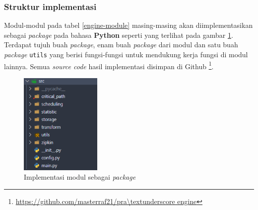 \subsubsection{Struktur implementasi}
Modul-modul pada tabel \ref{engine-module} masing-masing akan diimplementasikan sebagai \textit{package} pada bahasa \textbf{Python} seperti yang terlihat pada gambar \ref{package}. Terdapat tujuh buah \textit{package}, enam buah \textit{package} dari modul dan satu buah \textit{package} \texttt{utils} yang berisi fungsi-fungsi untuk mendukung kerja fungsi di modul lainnya. Semua \textit{source code} hasil implementasi disimpan di Github \footnote{\url{https://github.com/masterraf21/pra\textunderscore engine}}.
\begin{figure}[!htb]
	\centering
	\includegraphics[width=0.35\textwidth]{resources/ch4/packages.png}
	\caption{Implementasi modul sebagai \textit{package}}
	\label{package}
\end{figure} 

%

